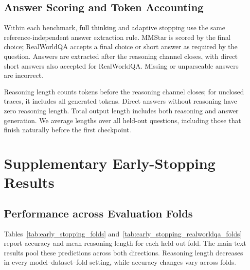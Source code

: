 \documentclass{article} %
\begin{document}
\subsection{Answer Scoring and Token Accounting}

Within each benchmark, full thinking and adaptive stopping use the same reference-independent answer extraction rule. MMStar is scored by the final choice; RealWorldQA accepts a final choice or short answer as required by the question. Answers are extracted after the reasoning channel closes, with direct short answers also accepted for RealWorldQA. Missing or unparseable answers are incorrect.

Reasoning length counts tokens before the reasoning channel closes; for unclosed traces, it includes all generated tokens. Direct answers without reasoning have zero reasoning length. Total output length includes both reasoning and answer generation. We average lengths over all held-out questions, including those that finish naturally before the first checkpoint.

\section{Supplementary Early-Stopping Results}
\label{app:stopping_results}

\subsection{Performance across Evaluation Folds}
\label{app:early_stopping_realworldqa}

Tables~\ref{tab:early_stopping_folds} and~\ref{tab:early_stopping_realworldqa_folds} report accuracy and mean reasoning length for each held-out fold. The main-text results pool these predictions across both directions. Reasoning length decreases in every model--dataset--fold setting, while accuracy changes vary across folds.
\end{document}
